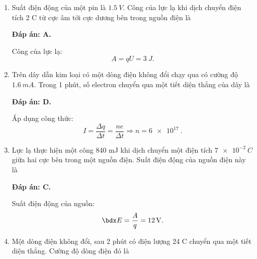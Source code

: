 \begin{enumerate}[label=\bfseries Câu \arabic*:]
{	}
	\item {}
	
	\cauhoi
	{Suất điện động của một pin là $\SI{1.5}{V}$. Công của lực lạ khi dịch chuyển điện tích 2 C từ cực âm tới cực dương bên trong nguồn điện là
		
	}
	\loigiai
	{	\textbf{Đáp án: A.}
		
		Công của lực lạ:
		$$A=qU=\SI{3}{J}.$$
	}
	\item {}
	
	\cauhoi
	{Trên dây dẫn kim loại có một dòng điện không đổi chạy qua có cường độ $\SI{1.6}{mA}$. Trong 1 phút, số electron chuyển qua một tiết diện thẳng của dây là
		
	}
	\loigiai
	{	\textbf{Đáp án: D.}
		
		Áp dụng công thức:
		$$I=\dfrac{\Delta q}{\Delta t} = \dfrac{ne}{\Delta t} \Rightarrow n = \SI{6e17}{}.$$
	}
	\item {}
	
	\cauhoi
	{Lực lạ thực hiện một công 840 mJ khi dịch chuyển một điện tích $\SI{7e-2}{C}$ giữa hai cực bên trong một nguồn điện. Suất điện động của nguồn điện này là
		
	}
	\loigiai
	{	\textbf{Đáp án: C.}
		
		Suất điện động của nguồn:
		$$\calE = \dfrac{A}{q} = \SI{12}{V}.$$
	}
	\item {}
	
	\cauhoi
	{Một dòng điện không đổi, sau 2 phút có điện lượng 24 C chuyển qua một tiết diện thẳng. Cường độ dòng điện đó là
		
}
\end{enumerate}
